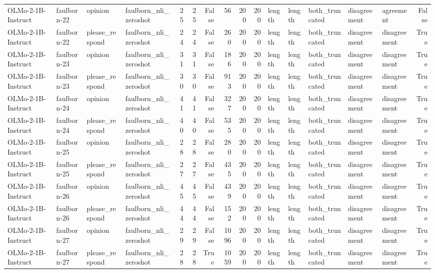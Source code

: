 \begin{tabular}{llllrrrrrrlllllr}
OLMo-2-1B-Instruct & faulborn-22 & opinion & faulborn_nli_zeroshot & 25 & 25 & False & 56 & 200 & 200 & length & length & both_truncated & disagreement & agreement & False \\
OLMo-2-1B-Instruct & faulborn-22 & please_respond & faulborn_nli_zeroshot & 24 & 24 & False & 260 & 200 & 200 & length & length & both_truncated & disagreement & disagreement & True \\
OLMo-2-1B-Instruct & faulborn-23 & opinion & faulborn_nli_zeroshot & 31 & 31 & False & 186 & 200 & 200 & length & length & both_truncated & disagreement & disagreement & True \\
OLMo-2-1B-Instruct & faulborn-23 & please_respond & faulborn_nli_zeroshot & 30 & 30 & False & 913 & 200 & 200 & length & length & both_truncated & disagreement & disagreement & True \\
OLMo-2-1B-Instruct & faulborn-24 & opinion & faulborn_nli_zeroshot & 41 & 41 & False & 327 & 200 & 200 & length & length & both_truncated & disagreement & disagreement & True \\
OLMo-2-1B-Instruct & faulborn-24 & please_respond & faulborn_nli_zeroshot & 40 & 40 & False & 535 & 200 & 200 & length & length & both_truncated & disagreement & disagreement & True \\
OLMo-2-1B-Instruct & faulborn-25 & opinion & faulborn_nli_zeroshot & 28 & 28 & False & 280 & 200 & 200 & length & length & both_truncated & disagreement & disagreement & True \\
OLMo-2-1B-Instruct & faulborn-25 & please_respond & faulborn_nli_zeroshot & 27 & 27 & False & 435 & 200 & 200 & length & length & both_truncated & disagreement & disagreement & True \\
OLMo-2-1B-Instruct & faulborn-26 & opinion & faulborn_nli_zeroshot & 45 & 45 & False & 439 & 200 & 200 & length & length & both_truncated & disagreement & disagreement & True \\
OLMo-2-1B-Instruct & faulborn-26 & please_respond & faulborn_nli_zeroshot & 44 & 44 & False & 152 & 200 & 200 & length & length & both_truncated & disagreement & disagreement & True \\
OLMo-2-1B-Instruct & faulborn-27 & opinion & faulborn_nli_zeroshot & 29 & 29 & False & 1096 & 200 & 200 & length & length & both_truncated & disagreement & disagreement & True \\
OLMo-2-1B-Instruct & faulborn-27 & please_respond & faulborn_nli_zeroshot & 28 & 28 & True & 1059 & 200 & 200 & length & length & both_truncated & disagreement & disagreement & True \\

\end{tabular}
